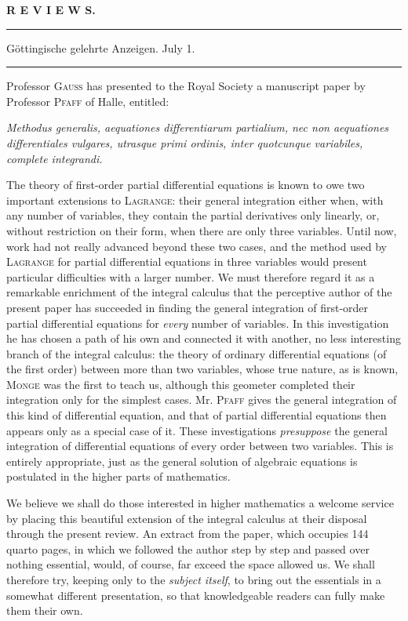 \clearpage{}
\begin{center}\textbf{R E V I E W S.}\par\bigskip
\rule{.85\linewidth}{.4pt}\par
Göttingische gelehrte Anzeigen. July 1.\par
\rule{.85\linewidth}{.4pt}\end{center}
Professor \textsc{Gauss} has presented to the Royal Society a manuscript paper by Professor \textsc{Pfaff} of Halle, entitled:
\begin{center}\textit{Methodus generalis, aequationes differentiarum partialium, nec non aequationes differentiales vulgares, utrasque primi ordinis, inter quotcunque variabiles, complete integrandi.}\end{center}
The theory of first-order partial differential equations is known to owe two important extensions to \textsc{Lagrange}: their general integration either when, with any number of variables, they contain the partial derivatives only linearly, or, without restriction on their form, when there are only three variables. Until now, work had not really advanced beyond these two cases, and the method used by \textsc{Lagrange} for partial differential equations in three variables would present particular difficulties with a larger number. We must therefore regard it as a remarkable enrichment of the integral calculus that the perceptive author of the present paper has succeeded in finding the general integration of first-order partial differential equations for \textit{every} number of variables. In this investigation he has chosen a path of his own%
 and connected it with another, no less interesting branch of the integral calculus: the theory of ordinary differential equations (of the first order) between more than two variables, whose true nature, as is known, \textsc{Monge} was the first to teach us, although this geometer completed their integration only for the simplest cases. Mr. \textsc{Pfaff} gives the general integration of this kind of differential equation, and that of partial differential equations then appears only as a special case of it. These investigations \textit{presuppose} the general integration of differential equations of every order between two variables. This is entirely appropriate, just as the general solution of algebraic equations is postulated in the higher parts of mathematics.

We believe we shall do those interested in higher mathematics a welcome service by placing this beautiful extension of the integral calculus at their disposal through the present review. An extract from the paper, which occupies 144 quarto pages, in which we followed the author step by step and passed over nothing essential, would, of course, far exceed the space allowed us. We shall therefore try, keeping only to the \textit{subject itself}, to bring out the essentials in a somewhat different presentation, so that knowledgeable readers can fully make them their own.

